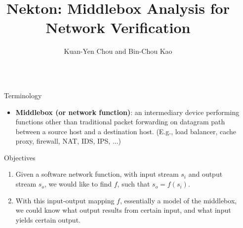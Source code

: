 \documentclass[final,hyperref={pdfpagelabels=false}]{beamer}
\title{\huge Nekton: Middlebox Analysis for Network Verification} %
\author{Kuan-Yen Chou and Bin-Chou Kao} %
\institute{CS @ UIUC} %
\begin{document}

\begin{frame}[t,fragile] %

\begin{columns}[t] %

\begin{column}{.02\textwidth}\end{column} %

\begin{column}{.465\textwidth} %


\begin{block}{Terminology}

\begin{itemize}
    \item \textbf{Middlebox (or network function)}: an intermediary device
        performing functions other than traditional packet forwarding on
        datagram path between a source host and a destination host.
        (E.g., load balancer, cache proxy, firewall, NAT, IDS, IPS, ...)
\end{itemize}

\end{block}


\begin{block}{Objectives}

\begin{enumerate}
    \item Given a software network function, with input stream $s_i$ and output
        stream $s_o$, we would like to find $f$, such that $s_o = f(s_i)$.
    \item With this input-output mapping $f$, essentially a model of the
        middlebox, we could know what output results from certain input, and
        what input yields certain output.
\end{enumerate}


\end{block}
\end{column}
\end{columns}
\end{frame}
\end{document}

